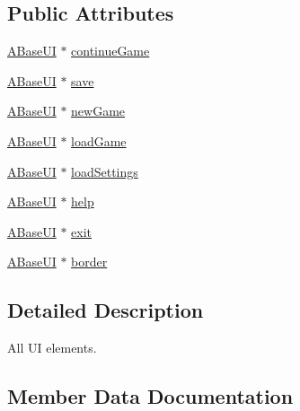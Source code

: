 \subsection*{Public Attributes}
\begin{DoxyCompactItemize}
\item 
\hyperlink{class_a_base_u_i}{A\+Base\+UI} $\ast$ \hyperlink{struct_scene_main_menu_1_1_all_u_i_acbfc7a90c7fe59b0f5c452f37944238d}{continue\+Game}
\item 
\hyperlink{class_a_base_u_i}{A\+Base\+UI} $\ast$ \hyperlink{struct_scene_main_menu_1_1_all_u_i_a801aade41279dd9c41b1c09b1ab74459}{save}
\item 
\hyperlink{class_a_base_u_i}{A\+Base\+UI} $\ast$ \hyperlink{struct_scene_main_menu_1_1_all_u_i_a51cbd15371ce654749adf34402e64aed}{new\+Game}
\item 
\hyperlink{class_a_base_u_i}{A\+Base\+UI} $\ast$ \hyperlink{struct_scene_main_menu_1_1_all_u_i_af40f78e33f1a3674fab5c83ce44338f3}{load\+Game}
\item 
\hyperlink{class_a_base_u_i}{A\+Base\+UI} $\ast$ \hyperlink{struct_scene_main_menu_1_1_all_u_i_ab29e5beed68a4762fb48ccc01989c6bb}{load\+Settings}
\item 
\hyperlink{class_a_base_u_i}{A\+Base\+UI} $\ast$ \hyperlink{struct_scene_main_menu_1_1_all_u_i_abaa789fa8e9f3b3d694a8fe853ac5821}{help}
\item 
\hyperlink{class_a_base_u_i}{A\+Base\+UI} $\ast$ \hyperlink{struct_scene_main_menu_1_1_all_u_i_ab8266966efdf73dac22cf85f67a1f9de}{exit}
\item 
\hyperlink{class_a_base_u_i}{A\+Base\+UI} $\ast$ \hyperlink{struct_scene_main_menu_1_1_all_u_i_ae0a3df76b19cfbde641c126be24c327a}{border}
\end{DoxyCompactItemize}


\subsection{Detailed Description}
All UI elements. 

\subsection{Member Data Documentation}
\mbox{\label{struct_scene_main_menu_1_1_all_u_i_ae0a3df76b19cfbde641c126be24c327a}} 
